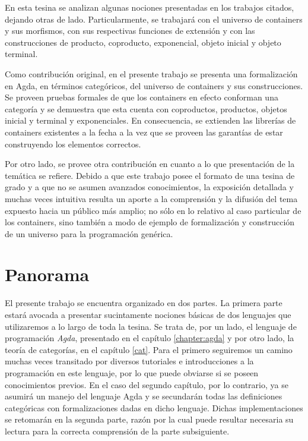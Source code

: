 En esta tesina se analizan algunas nociones presentadas en los trabajos citados, dejando otras de lado. Particularmente, se trabajará con el universo de containers y sus morfismos, con sus respectivas funciones de extensión y con las construcciones de producto, coproducto, exponencial, objeto inicial y objeto terminal. 

Como contribución original, en el presente trabajo se presenta una formalización en Agda, en términos categóricos, del universo de containers y sus construcciones. Se proveen pruebas formales de que los containers en efecto conforman una categoría y se demuestra que esta cuenta con coproductos, productos, objetos inicial y terminal y exponenciales. En consecuencia, se extienden las librerías de containers existentes a la fecha a la vez que se proveen las garantías de estar construyendo los elementos correctos.

Por otro lado, se provee otra contribución en cuanto a lo que presentación de la temática se refiere. Debido a que este trabajo posee el formato de una tesina de grado y a que no se asumen avanzados conocimientos, la exposición detallada y muchas veces intuitiva resulta un aporte a la comprensión y la difusión del tema expuesto hacia un público más amplio; no sólo en lo relativo al caso particular de los containers, sino también a modo de ejemplo de formalización y construcción de un universo para la programación genérica.


\section*{Panorama}

El presente trabajo se encuentra organizado en dos partes.
La primera parte estará avocada a presentar sucintamente nociones básicas de dos lenguajes que utilizaremos a lo largo de toda la tesina. Se trata de, por un lado, el lenguaje de programación {\it Agda}, presentado en el capítulo \ref{chapter:agda} y por otro lado, la teoría de categorías, en el capítulo \ref{cat}. Para el primero seguiremos un camino muchas veces transitado por diversos tutoriales e introducciones a la programación en este lenguaje, por lo que puede obviarse si se poseen conocimientos previos. En el caso del segundo capítulo, por lo contrario, ya se asumirá un manejo del lenguaje Agda y se secundarán todas las definiciones categóricas con formalizaciones dadas en dicho lenguaje. Dichas implementaciones se retomarán en la segunda parte, razón por la cual puede resultar necesaria su lectura para la correcta comprensión de la parte subsiguiente.

